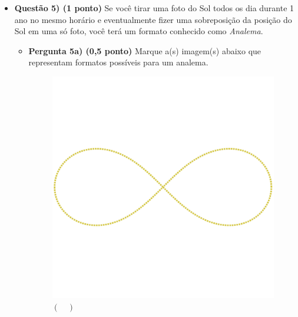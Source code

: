 \documentclass[a4paper, 12pt]{article}
\begin{document}
\begin{flushleft}
\begin{itemize}
		\item \textbf{Questão 5) (1 ponto)} Se você tirar uma foto do Sol todos os dia durante 1 ano no mesmo horário e eventualmente fizer uma sobreposição da posição do Sol em uma só foto, você terá um formato conhecido como \textit{Analema}.
			\begin{itemize}
				\item \textbf{Pergunta 5a) (0,5 ponto)} Marque a(s) imagem(s) abaixo que representam formatos possíveis para um analema.
					\begin{multicols}{2}
						\begin{figure}[H]
							\centering
							\includegraphics[scale=0.15]{./img/5a}
							\captionsetup{labelformat=empty}
							\caption{$(\quad)$}
						\end{figure}
						\begin{figure}[H]
							\centering

\end{figure}
\end{multicols}
\end{itemize}
\end{itemize}
\end{flushleft}
\end{document}
